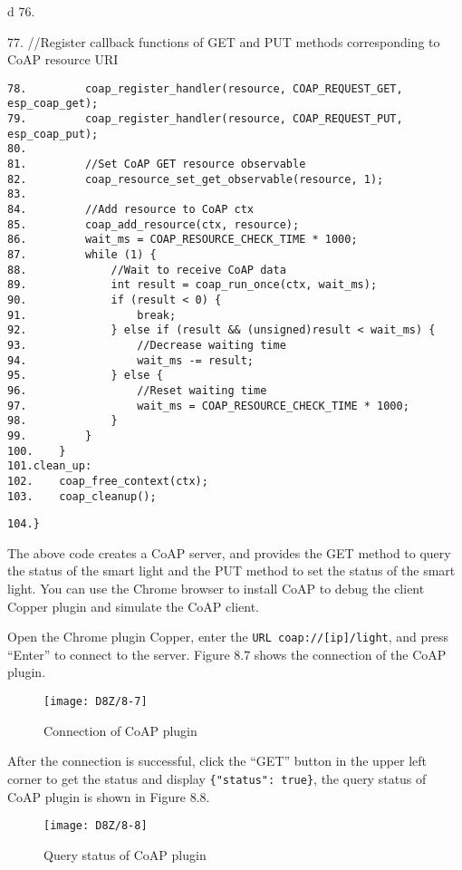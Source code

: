 \documentclass[a4paper,12pt]{book}
\begin{document}
\begin{codebloc}
\begin{tabular}{d}
76.	

77. \fontsize{8.5pt}{10pt}\selectfont//Register callback functions of GET and PUT methods corresponding to CoAP resource URI
\footnotesize
\begin{verbatim}
78.         coap_register_handler(resource, COAP_REQUEST_GET, esp_coap_get);
79.         coap_register_handler(resource, COAP_REQUEST_PUT, esp_coap_put);
80.	
81.         //Set CoAP GET resource observable
82.         coap_resource_set_get_observable(resource, 1);
83.	
84.         //Add resource to CoAP ctx
85.         coap_add_resource(ctx, resource);
86.         wait_ms = COAP_RESOURCE_CHECK_TIME * 1000;
87.         while (1) {
88.             //Wait to receive CoAP data
89.             int result = coap_run_once(ctx, wait_ms);
90.             if (result < 0) {
91.                 break;
92.             } else if (result && (unsigned)result < wait_ms) {
93.                 //Decrease waiting time
94.                 wait_ms -= result;
95.             } else {
96.                 //Reset waiting time
97.                 wait_ms = COAP_RESOURCE_CHECK_TIME * 1000;
98.             }
99.         }
100.    }
101.clean_up:
102.    coap_free_context(ctx);
103.    coap_cleanup();
\end{verbatim}
\verb|104.}|
\end{tabular}
\end{codebloc}

The above code creates a CoAP server, and provides the GET method to query the status of the smart light and the PUT method to set the status of the smart light. You can use the Chrome browser to install CoAP to debug the client Copper plugin and simulate the CoAP client.

Open the Chrome plugin Copper, enter the \verb|URL coap://[ip]/light|, and press “Enter” to connect to the server. Figure 8.7 shows the connection of the CoAP plugin.

\begin{figure}[!h]
    \centering
    \texttt{[image: D8Z/8-7]}
    \caption{Connection of CoAP plugin}
\end{figure}

After the connection is successful, click the “GET” button in the upper left corner to get the status and display \verb|{"status": true}|, the query status of CoAP plugin is shown in Figure 8.8.

\begin{figure}[!h]
    \centering
    \texttt{[image: D8Z/8-8]}
    \caption{Query status of CoAP plugin}
\end{figure}
\end{document}
